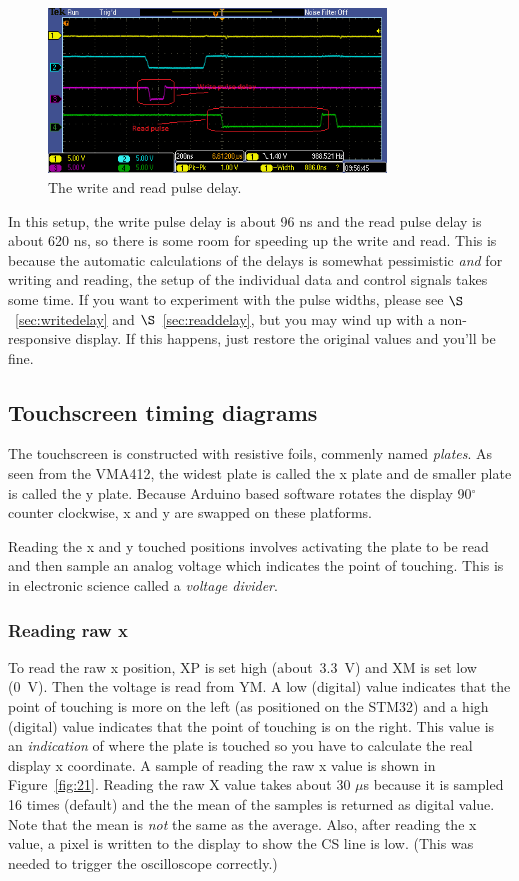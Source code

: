 \documentclass[12pt]{article}
\begin{document}
\begin{figure}[!ht]
\centering
\includegraphics[width=0.8\textwidth]{write_read_delay}
\caption{The write and read pulse delay.}
\label{fig:12}
\end{figure}

In this setup, the write pulse delay is about 96 ns and the read pulse delay is about 620 ns, so there is some room for speeding up the write and read. This is because the automatic calculations of the delays is somewhat pessimistic \textsl{and} for writing and reading, the setup of the individual data and control signals takes some time. If you want to experiment with the pulse widths, please see $\S$~\ref{sec:writedelay} and $\S$~\ref{sec:readdelay}, but you may wind up with a non-responsive display. If this happens, just restore the original values and you'll be fine.


\subsection{Touchscreen timing diagrams}
\label{sec:tstidi}
The touchscreen is constructed with resistive foils, commenly named \textsl{plates}. As seen from the VMA412, the widest plate is called the x plate and de smaller plate is called the y plate. Because Arduino based software rotates the display 90$^\circ$ counter clockwise, x and y are swapped on these platforms.

Reading the x and y touched positions involves activating the plate to be read and then sample an analog voltage which indicates the point of touching. This is in electronic science called a \textsl{voltage divider}.

\subsubsection{Reading raw x}
To read the raw x position, XP is set high (about~3.3~V) and XM is set low (0~V). Then the voltage is read from YM. A low (digital) value indicates that the point of touching is more on the left (as positioned on the STM32) and a high (digital) value indicates that the point of touching is on the right. This value is an \textsl{indication} of where the plate is touched so you have to calculate the real display x coordinate. A sample of reading the raw x value is shown in Figure~\ref{fig:21}. Reading the raw X value takes about 30 $\mu$s because it is sampled 16 times (default) and the the mean of the samples is returned as digital value. Note that the mean is \textsl{not} the same as the average. Also, after reading the x value, a pixel is written to the display to show the CS line is low. (This was needed to trigger the oscilloscope correctly.)
\end{document}
